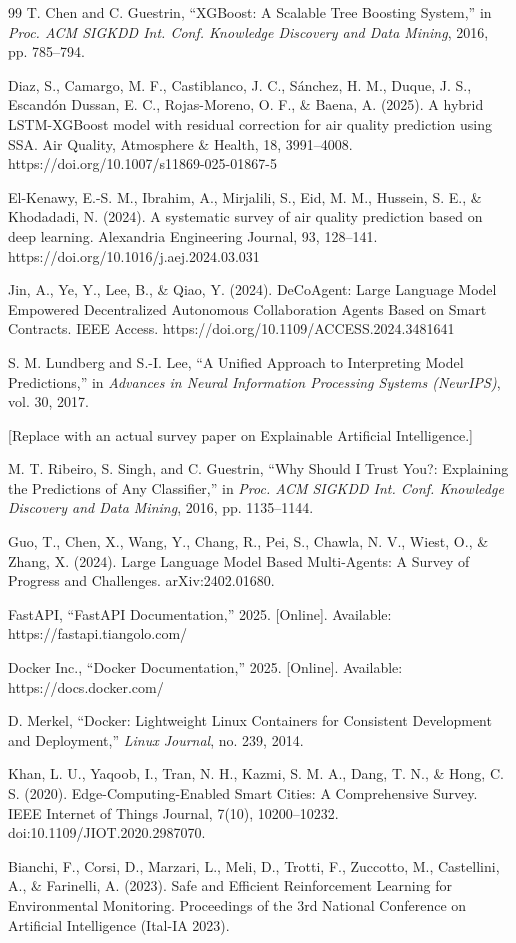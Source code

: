 \documentclass[conference]{IEEEtran}
\begin{document}
\begin{thebibliography}{99}
T. Chen and C. Guestrin, ``XGBoost: A Scalable Tree Boosting System,'' in \emph{Proc. ACM SIGKDD Int. Conf. Knowledge Discovery and Data Mining}, 2016, pp. 785--794.

Diaz, S., Camargo, M. F., Castiblanco, J. C., Sánchez, H. M., Duque, J. S., Escandón Dussan, E. C., Rojas-Moreno, O. F., \& Baena, A. (2025). A hybrid LSTM-XGBoost model with residual correction for air quality prediction using SSA. Air Quality, Atmosphere \& Health, 18, 3991--4008. https://doi.org/10.1007/s11869-025-01867-5

El-Kenawy, E.-S. M., Ibrahim, A., Mirjalili, S., Eid, M. M., Hussein, S. E., \& Khodadadi, N. (2024). A systematic survey of air quality prediction based on deep learning. Alexandria Engineering Journal, 93, 128--141. https://doi.org/10.1016/j.aej.2024.03.031

Jin, A., Ye, Y., Lee, B., \& Qiao, Y. (2024). DeCoAgent: Large Language Model Empowered Decentralized Autonomous Collaboration Agents Based on Smart Contracts. IEEE Access. https://doi.org/10.1109/ACCESS.2024.3481641

S. M. Lundberg and S.-I. Lee, ``A Unified Approach to Interpreting Model Predictions,'' in \emph{Advances in Neural Information Processing Systems (NeurIPS)}, vol. 30, 2017.

[Replace with an actual survey paper on Explainable Artificial Intelligence.]

M. T. Ribeiro, S. Singh, and C. Guestrin, ``Why Should I Trust You?: Explaining the Predictions of Any Classifier,'' in \emph{Proc. ACM SIGKDD Int. Conf. Knowledge Discovery and Data Mining}, 2016, pp. 1135--1144.

Guo, T., Chen, X., Wang, Y., Chang, R., Pei, S., Chawla, N. V., Wiest, O., \& Zhang, X. (2024). Large Language Model Based Multi-Agents: A Survey of Progress and Challenges. arXiv:2402.01680.

FastAPI, ``FastAPI Documentation,'' 2025. [Online]. Available: https://fastapi.tiangolo.com/

Docker Inc., ``Docker Documentation,'' 2025. [Online]. Available: https://docs.docker.com/

D. Merkel, ``Docker: Lightweight Linux Containers for Consistent Development and Deployment,'' \emph{Linux Journal}, no. 239, 2014.

Khan, L. U., Yaqoob, I., Tran, N. H., Kazmi, S. M. A., Dang, T. N., \& Hong, C. S. (2020). Edge-Computing-Enabled Smart Cities: A Comprehensive Survey. IEEE Internet of Things Journal, 7(10), 10200--10232. doi:10.1109/JIOT.2020.2987070.

Bianchi, F., Corsi, D., Marzari, L., Meli, D., Trotti, F., Zuccotto, M., Castellini, A., \& Farinelli, A. (2023). Safe and Efficient Reinforcement Learning for Environmental Monitoring. Proceedings of the 3rd National Conference on Artificial Intelligence (Ital-IA 2023).

\end{thebibliography}
\end{document}
